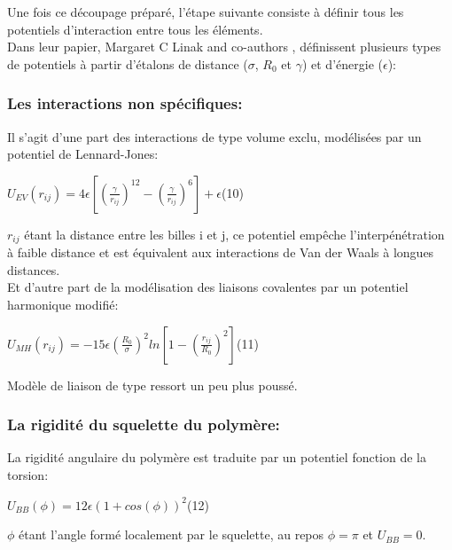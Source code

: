 \documentclass[a4paper,11pt]{article}
\begin{document}
Une fois ce découpage préparé, l'étape suivante consiste à définir tous les potentiels d'interaction entre tous les éléments.\\

Dans leur papier, Margaret C Linak and co-authors \cite{jchem}, définissent plusieurs types de potentiels à partir d'étalons de distance ($\sigma$, $R_0$ et $\gamma$) et d'énergie ($\epsilon$):

\subsubsection*{Les interactions non spécifiques:}

Il s'agit d'une part des interactions de type volume exclu, modélisées par un potentiel de Lennard-Jones:

\begin{center}

$U_{EV}(r_{ij})= 4\epsilon [(\frac{\gamma}{r_{ij}})^{12}-(\frac{\gamma}{r_{ij}})^{6}] + \epsilon$\flushright(10)


\end{center}

$r_{ij}$ étant la distance entre les billes i et j, ce potentiel empêche l'interpénétration à faible distance et est équivalent aux interactions de Van der Waals à longues distances.\\

Et d'autre part de la modélisation des liaisons covalentes par un potentiel harmonique modifié:
\begin{center}
$U_{MH}(r_{ij})= -15\epsilon (\frac{R_0}{\sigma})^2 ln[1-(\frac{r_{ij}}{R_0})^2]$\flushright(11)
\end{center}

Modèle de liaison de type ressort un peu plus poussé.


\subsubsection*{La rigidité du squelette du polymère:}

La rigidité angulaire du polymère est traduite par un potentiel fonction de la torsion:

\begin{center}
$U_{BB}(\phi)= 12\epsilon (1+cos(\phi))^2$\flushright(12)
\end{center}

$\phi$ étant l'angle formé localement par le squelette, au repos $\phi=\pi$ et $U_{BB}=0$.
\end{document}
